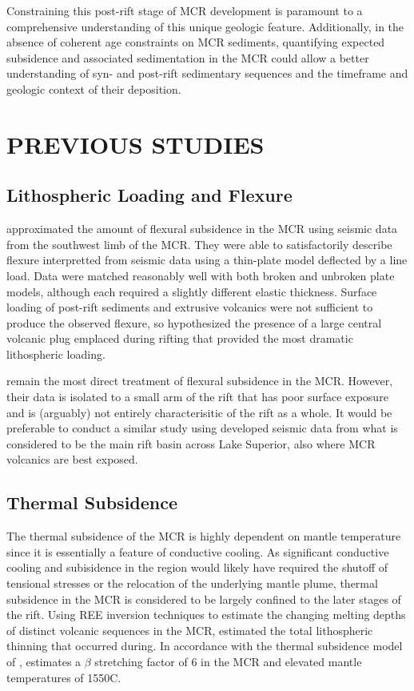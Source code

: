 \documentclass[12pt,letterpaper]{article}
\begin{document}
Constraining this post-rift stage of MCR development is paramount to a comprehensive understanding of this unique geologic feature. Additionally, in the absence of coherent age constraints on MCR sediments, quantifying expected subsidence and associated sedimentation in the MCR could allow a better understanding of syn- and post-rift sedimentary sequences and the timeframe and geologic context of their deposition.\par

\section*{PREVIOUS STUDIES}
\subsection*{Lithospheric Loading and Flexure}
\cite{Nyquist1988a} approximated the amount of flexural subsidence in the MCR using seismic data from the southwest limb of the MCR. They were able to satisfactorily describe flexure interpretted from seismic data using a thin-plate model deflected by a line load. Data were matched reasonably well with both broken and unbroken plate models, although each required a slightly different elastic thickness. Surface loading of post-rift sediments and extrusive volcanics were not sufficient to produce the observed flexure, so \cite{Nyquist1988a} hypothesized the presence of a large central volcanic plug emplaced during rifting that provided the most dramatic lithospheric loading.\par

\cite{Nyquist1988a} remain the most direct treatment of flexural subsidence in the MCR. However, their data is isolated to a small arm of the rift that has poor surface exposure and is (arguably) not entirely characterisitic of the rift as a whole. It would be preferable to conduct a similar study using developed seismic data \citep{Behrendt1990a} from what is considered to be the main rift basin across Lake Superior, also where MCR volcanics are best exposed.\par

\subsection*{Thermal Subsidence} 
The thermal subsidence of the MCR is highly dependent on mantle temperature since it is essentially a feature of conductive cooling. As significant conductive cooling and subisidence in the region would likely have required the shutoff of tensional stresses or the relocation of the underlying mantle plume, thermal subsidence in the MCR is considered to be largely confined to the later stages of the rift. Using REE inversion techniques to estimate the changing melting depths of distinct volcanic sequences in the MCR, \cite{White1997a} estimated the total lithospheric thinning that occurred during. In accordance with the thermal subsidence model of \cite{McKenzie1978a}, \cite{White1997a} estimates a $\beta$ stretching factor of 6 in the MCR and elevated mantle temperatures of 1550\textdegree C. 
\end{document}
